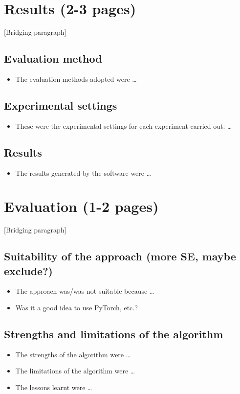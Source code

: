 \documentclass[12pt,a4paper]{article}
\begin{document}
\newpage
\section{Results (2-3 pages)}
[Bridging paragraph]
\subsection{Evaluation method}
\begin{itemize}
    \item The evaluation methods adopted were \dots
\end{itemize}

\subsection{Experimental settings}
\begin{itemize}
    \item These were the experimental settings for each experiment carried out: \dots
\end{itemize}

\subsection{Results}
\begin{itemize}
    \item The results generated by the software were \dots
\end{itemize}

\newpage
\section{Evaluation (1-2 pages)}
[Bridging paragraph]
\subsection{Suitability of the approach (more SE, maybe exclude?)}
\begin{itemize}
    \item The approach was/was not suitable because \dots
    \item Was it a good idea to use PyTorch, etc.?
\end{itemize}

\subsection{Strengths and limitations of the algorithm} 
\begin{itemize}
    \item The strengths of the algorithm were \dots
    \item The limitations of the algorithm were \dots
    \item The lessons learnt were \dots
\end{itemize}
\end{document}
